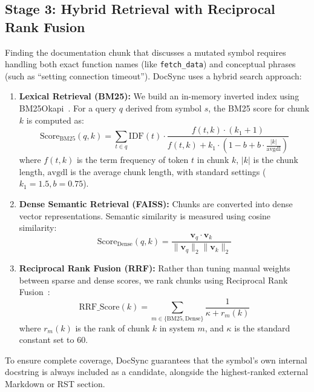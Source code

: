 \documentclass[12pt,onecolumn,draftclsnofoot]{IEEEtran}
\begin{document}
\subsection{Stage 3: Hybrid Retrieval with Reciprocal Rank Fusion}
Finding the documentation chunk that discusses a mutated symbol requires handling both exact function names (like \texttt{fetch\_data}) and conceptual phrases (such as ``setting connection timeout''). DocSync uses a hybrid search approach:
\begin{enumerate}
    \item \textbf{Lexical Retrieval (BM25):} We build an in-memory inverted index using BM25Okapi~\cite{robertson2009bm25}. For a query $q$ derived from symbol $s$, the BM25 score for chunk $k$ is computed as:
    \begin{equation}
    \text{Score}_{\text{BM25}}(q, k) = \sum_{t \in q} \text{IDF}(t) \cdot \frac{f(t, k) \cdot (k_1 + 1)}{f(t, k) + k_1 \cdot \left(1 - b + b \cdot \frac{|k|}{\text{avgdl}}\right)}
    \end{equation}
    where $f(t, k)$ is the term frequency of token $t$ in chunk $k$, $|k|$ is the chunk length, $\text{avgdl}$ is the average chunk length, with standard settings ($k_1 = 1.5, b = 0.75$).
    \item \textbf{Dense Semantic Retrieval (FAISS):} Chunks are converted into dense vector representations. Semantic similarity is measured using cosine similarity:
    \begin{equation}
    \text{Score}_{\text{Dense}}(q, k) = \frac{\mathbf{v}_q \cdot \mathbf{v}_k}{\|\mathbf{v}_q\|_2 \|\mathbf{v}_k\|_2}
    \end{equation}
    \item \textbf{Reciprocal Rank Fusion (RRF):} Rather than tuning manual weights between sparse and dense scores, we rank chunks using Reciprocal Rank Fusion~\cite{cormack2009rrf}:
    \begin{equation}
    \text{RRF\_Score}(k) = \sum_{m \in \{\text{BM25}, \text{Dense}\}} \frac{1}{\kappa + r_m(k)}
    \end{equation}
    where $r_m(k)$ is the rank of chunk $k$ in system $m$, and $\kappa$ is the standard constant set to 60.
\end{enumerate}

To ensure complete coverage, DocSync guarantees that the symbol's own internal docstring is always included as a candidate, alongside the highest-ranked external Markdown or RST section.
\end{document}
